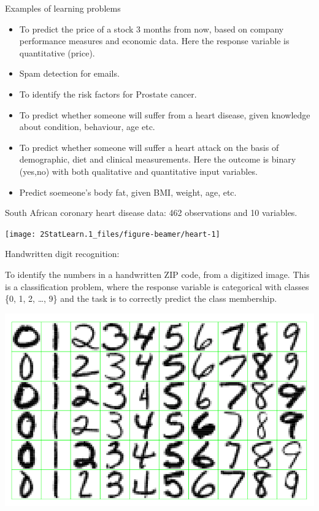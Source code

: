 \documentclass[ignorenonframetext,]{beamer}
\begin{document}
\begin{frame}{Examples of learning problems}

\begin{itemize}
\item
  To predict the price of a stock 3 months from now, based on company
  performance measures and economic data. Here the response variable is
  quantitative (price).
\item
  Spam detection for emails.
\item
  To identify the risk factors for Prostate cancer.
\item
  To predict whether someone will suffer from a heart disease, given
  knowledge about condition, behaviour, age etc.
\item
  To predict whether someone will suffer a heart attack on the basis of
  demographic, diet and clinical measurements. Here the outcome is
  binary ({yes},{no}) with both qualitative and quantitative input
  variables.
\item
  Predict soemeone's body fat, given BMI, weight, age, etc.
\end{itemize}

\end{frame}

\begin{frame}

South African coronary heart disease data: 462 observations and 10
variables.

\begin{center}\texttt{[image: 2StatLearn.1\_files/figure-beamer/heart-1]} \end{center}

\end{frame}

\begin{frame}

\begin{block}{Handwritten digit recognition:}

To identify the numbers in a handwritten ZIP code, from a digitized
image. This is a classification problem, where the response variable is
categorical with classes \{0, 1, 2, \ldots{}, 9\} and the task is to
correctly predict the class membership.

\includegraphics{digits.png}

\end{block}

\end{frame}
\end{document}
